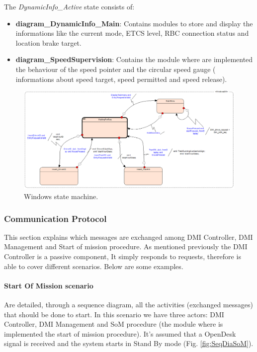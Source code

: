   The \textit{ DynamicInfo\_Active} state consists of:
  \begin{itemize}
  	\item \textbf{diagram\_DynamicInfo\_Main}: Contains modules to store and display the informations like the current mode, ETCS level, RBC connection status and location brake target.
  	\item \textbf{diagram\_SpeedSupervision}: Contains the module where are implemented the behaviour of the speed pointer and the circular speed gauge ( informations about speed target, speed permitted and speed release).
  \end{itemize}
  
  \begin{figure}
  	\centering
  	\includegraphics[width=\textwidth]{images/WindowSM}
  	\caption{Windows state machine.}\label{fig:win_sm}
  \end{figure}
  
\subsubsection{Communication Protocol}
This section explains which messages are exchanged among DMI Controller, DMI Management and Start of mission procedure. As mentioned previously the DMI Controller is a passive component, It simply responds to requests, therefore is able to cover different scenarios. Below are some examples.
  
  \paragraph{ Start Of Mission scenario} Are detailed, through a sequence diagram, all the activities (exchanged messages) that should be done to start. In this scenario we have three actors: DMI Controller, DMI Management and SoM procedure (the module where is implemented the start of mission procedure). It's assumed that a OpenDesk signal is received and the system starts in Stand By mode (Fig. \ref{fig:SeqDiaSoM}).
 
